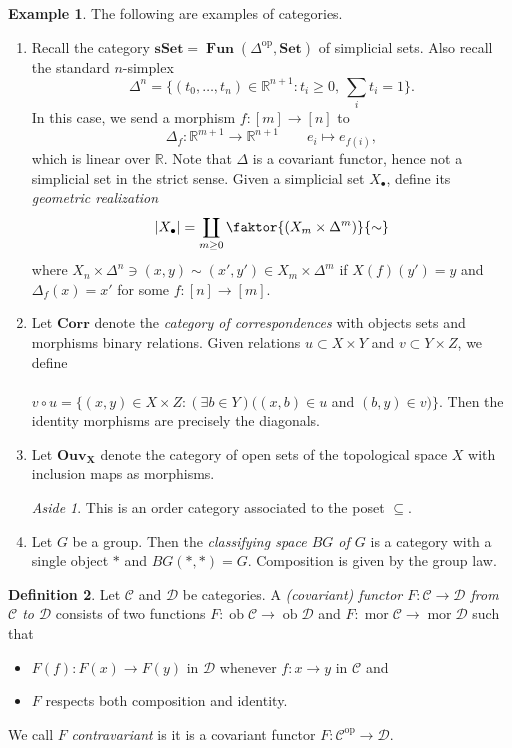 \documentclass[10pt,letterpaper,cm]{nupset}
\theoremstyle{definition}
\newtheorem{definition}{Definition}[subsection]
\newtheorem{exmp}[definition]{Example}
\theoremstyle{theorem}
\theoremstyle{remark}
\newtheorem*{aside}{Aside}
\newcommand{\R}{\mathbb R}
\newcommand{\1}{\mathbf{1}}
\renewcommand{\c}{\mathscr{C}}
\renewcommand{\d}{\mathscr{D}}
\newcommand{\0}{\vec 0}
\DeclareMathOperator{\op}{op}
\DeclareMathOperator{\mor}{mor}
\DeclareMathOperator{\ob}{ob}
\DeclareMathOperator{\Fun}{\mathbf{Fun}}
\begin{document}
\begin{exmp} The following are examples of categories.
\begin{enumerate}
\item Recall the category $\mathbf{sSet} = \Fun(\Delta^{\op}, \mathbf{Set})$ of simplicial sets. Also recall the standard $n$-simplex $$\Delta^n = \{(t_0, \ldots, t_n) \in \R^{n+1} : t_i \geq 0, \ \sum_i t_i =1\}.$$ In this case, we send a morphism $f : [m] \to [n]$ to $$\Delta_f : \R^{m+1} \to \R^{n+1} \quad \quad e_i \mapsto e_{f(i)},$$ which is linear over $\R$. Note that $\Delta$ is a covariant functor, hence not a simplicial set in the strict sense.
Given a simplicial set $X_{\bullet}$, define its \textit{geometric realization} $$|X_{\bullet}| = \coprod_{m\geq 0} \faktor{(X_m \times \Delta^m)}{\sim}$$ where $X_n \times \Delta^n \ni (x, y)\sim (x', y') \in X_m \times \Delta^m$ if $X(f)(y') = y$ and $\Delta_f(x) = x'$ for some $f: [n] \to [m]$.  
\item Let $\mathbf{Corr}$ denote the \textit{category of correspondences} with objects sets and morphisms binary relations. Given relations $u\subset X\times Y$ and $v \subset Y \times Z$, we define 
\\ \\ $v \circ u = \{(x, y) \in X \times Z : (\exists b \in Y)((x, b) \in u$ and $(b, y) \in v)\}.$ Then the identity morphisms are precisely the diagonals.
\item Let $\mathbf{Ouv_X}$ denote the category of open sets of the topological space $X$ with inclusion maps as morphisms. 
\begin{aside} This is an order category associated to the poset $\subseteq$. \end{aside}
\item Let $G$ be a group. Then the \textit{classifying space $BG$ of $G$} is a category with a single object $\ast$ and $BG(\ast, \ast) = G$. Composition is given by the group law.
\end{enumerate}
\end{exmp}

\begin{definition}
Let $\c$ and $\d$ be categories. A \textit{(covariant) functor $F: \c \to \d$ from $\c$ to $\d$} consists of two functions $F: \ob{\c} \to \ob{\d}$ and $F: \mor{\c} \to \mor{\d}$ such that 
\begin{itemize}
\item $F(f) : F(x) \to F(y)$ in $\d$ whenever $f: x \to y$ in $\c$ and
\item $F$ respects both composition and identity. 
\end{itemize}
We call $F$ \textit{contravariant} is it is a covariant functor $F: \c^{\op} \to \d$.
\end{definition}
\end{document}
